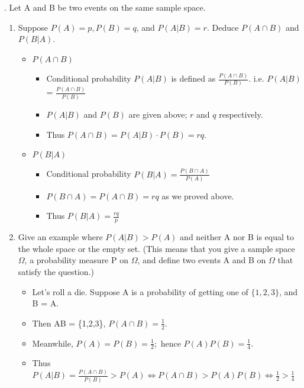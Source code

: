 \documentclass[12pt]{article}
\begin{document}
 


. Let A and B be two events on the same sample space. 
\begin{enumerate}[label=(\alph*)]
    \item Suppose $P(A) = p, P(B) = q$, and $P(A|B) = r$. Deduce $P(A \cap B)$ and $P(B|A)$.
        \begin{itemize}
            \item $P(A\cap B)$
                \begin{itemize}
                    \item Conditional probability $P(A|B)$ is defined as $\frac{P(A\cap B)}{P(B)}$. i.e. $P(A|B)$ = $\frac{P(A\cap B)}{P(B)}$
                    \item $P(A|B)$ and $P(B)$ are given above; $r$ and $q$ respectively.
                    \item Thus $P(A\cap B) = P(A|B) \cdot P(B) = rq.$
                \end{itemize}
            
            \item $P(B|A)$
                \begin{itemize}
                    \item Conditional probability $P(B|A) = \frac{P(B\cap A)}{P(A)}$ 
                    \item $P(B\cap A) = P(A\cap B) = rq$ as we proved above.
                    \item Thus $P(B|A) = \frac{rq}{p}$
                \end{itemize}
          \end{itemize}
          
    \item Give an example where $P(A|B) > P(A)$ and neither A nor B is equal to the whole space or the empty set. (This means that you give a sample space $\Omega$, a probability measure P on $\Omega$, and define two events A and B on $\Omega$ that satisfy the question.)
        \begin{itemize}
            \item Let's roll a die. Suppose A is a probability of getting one of $\{1,2,3\}$, and B = A.
            \item Then A\cap B = \{1,2,3\},  $P(A\cap B) = \frac{1}{2}$.
            \item Meanwhile, $P(A) = P(B) = \frac{1}{2};$ hence $P(A)P(B) = \frac{1}{4}$.
            \item Thus $P(A|B) = \frac{P(A\cap B)}{P(B)} > P(A) \Leftrightarrow P(A\cap B) > P(A)P(B) \Leftrightarrow \frac{1}{2} > \frac{1}{4}$
        \end{itemize}\\
        

\end{enumerate}
\end{document}

